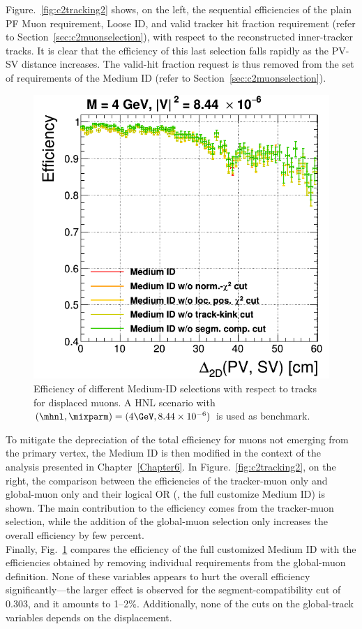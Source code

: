 Figure.~\ref{fig:c2tracking2} shows, on the left, the sequential
efficiencies of the plain PF Muon requirement,
Loose ID, and
valid tracker hit fraction requirement (refer to
Section~\ref{sec:c2muonselection}), with respect to the reconstructed inner-tracker tracks. It is clear that the efficiency of
this last selection 
falls rapidly as the PV-SV
distance increases. 
The valid-hit fraction request is thus removed from the set of
requirements of the Medium ID (refer to
Section~\ref{sec:c2muonselection}). 
\begin{figure}
\centering
\includegraphics[width=.4\textwidth]{Figures/c6/object/globalTrack_cuts_M-4_V-0p00290516780927_rho.png}
  \caption{Efficiency of different Medium-ID selections with respect to tracks for displaced
muons. A HNL scenario with
    $(\mhnl,\mixparm)=(4\GeV,8.44\times10^{-6})$ is used as
    benchmark. \dani}
  \label{fig:c2tracking3}
\end{figure}  
To mitigate the depreciation of the
total efficiency for muons not emerging from the primary vertex, the
Medium ID is then modified in the context of the analysis presented in
Chapter~\ref{Chapter6}. 
In Figure.~\ref{fig:c2tracking2}, on the
right, 
the comparison between the efficiencies of the
tracker-muon only and global-muon only and their logical OR (\ie, the full
customize Medium ID) is shown. The main contribution to the efficiency comes
from the tracker-muon selection, while the addition of the global-muon
selection only increases the overall efficiency by few percent.\\
Finally, Fig.~\ref{fig:c2tracking3} compares the efficiency of
the full customized Medium ID with the efficiencies obtained by removing
individual requirements from the global-muon definition. None of these variables
appears to hurt the overall efficiency significantly---the larger
effect is observed for the segment-compatibility cut of 0.303, and it
amounts to 1--2\%. Additionally, none of the cuts on the global-track
variables depends on the displacement.\\

